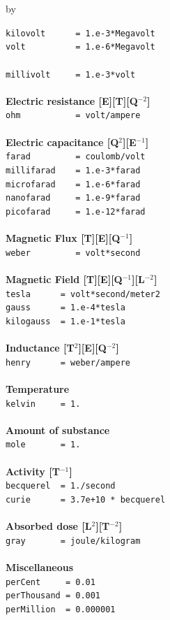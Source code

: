 \documentclass[twoside]{article}
\newcommand{\entrylabel}[1]{\mbox{\textbf{{#1}}}\hfil}%
\newenvironment{entry}
{\begin{list}{}%
    {\renewcommand{\makelabel}{\entrylabel}%
     \setlength{\labelwidth}{90pt}%
     \setlength{\leftmargin}{\labelwidth}
     \advance\leftmargin by \labelsep%
      }%
    }%
  {\end{list}}
\newcommand{\Entrylabel}[1]%
{\raisebox{0pt}[1ex][0pt]{\makebox[\labelwidth][l]%
    {\parbox[t]{\labelwidth}{\hspace{0pt}\textbf{{#1}}}}}}
\newenvironment{Entry}%
{\renewcommand{\entrylabel}{\Entrylabel}\begin{entry}}%
  {\end{entry}}
\begin{document}
\begin{Entry}
  \verb+kilovolt      = 1.e-3*Megavolt+ \\
  \verb+volt          = 1.e-6*Megavolt+ \\ \\
  \verb+millivolt     = 1.e-3*volt+ \\ \\
{\bf Electric resistance [E][T][Q$^{-2}$]} \\
  \verb+ohm           = volt/ampere+ \\ \\
{\bf Electric capacitance [Q$^{2}$][E$^{-1}$]} \\
  \verb+farad         = coulomb/volt+ \\
  \verb+millifarad    = 1.e-3*farad+ \\
  \verb+microfarad    = 1.e-6*farad+ \\
  \verb+nanofarad     = 1.e-9*farad+ \\
  \verb+picofarad     = 1.e-12*farad+ \\ \\
{\bf Magnetic Flux [T][E][Q$^{-1}$]} \\
  \verb+weber         = volt*second+ \\ \\
{\bf Magnetic Field [T][E][Q$^{-1}$][L$^{-2}$]} \\
  \verb+tesla      = volt*second/meter2+ \\
  \verb+gauss      = 1.e-4*tesla+ \\
  \verb+kilogauss  = 1.e-1*tesla+ \\ \\
{\bf Inductance [T$^{2}$][E][Q$^{-2}$]} \\
  \verb+henry      = weber/ampere+ \\ \\
{\bf Temperature} \\
  \verb+kelvin     = 1.+ \\ \\
{\bf Amount of substance} \\
  \verb+mole       = 1.+ \\ \\
{\bf Activity [T$^{-1}$]} \\
  \verb+becquerel  = 1./second+ \\
  \verb$curie      = 3.7e+10 * becquerel$ \\ \\
{\bf Absorbed dose [L$^{2}$][T$^{-2}$]} \\
  \verb+gray       = joule/kilogram+ \\ \\
{\bf Miscellaneous} \\
  \verb+perCent     = 0.01+ \\
  \verb+perThousand = 0.001+ \\
  \verb+perMillion  = 0.000001+ \\


\end{Entry}
\end{document}
